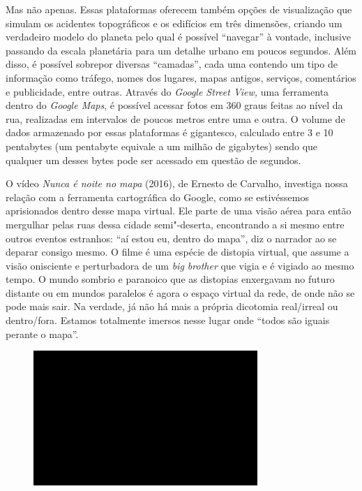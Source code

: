 Mas não apenas. Essas plataformas oferecem também opções de visualização
que simulam os acidentes topográficos e os edifícios em três dimensões,
criando um verdadeiro modelo do planeta pelo qual é possível ``navegar''
à vontade, inclusive passando da escala planetária para um detalhe
urbano em poucos segundos. Além disso, é possível sobrepor diversas
``camadas'', cada uma contendo um tipo de informação como tráfego, nomes
dos lugares, mapas antigos, serviços, comentários e publicidade, entre
outras. Através do \emph{Google Street View,} uma ferramenta dentro do
\emph{Google Maps}, é possível acessar fotos em 360 graus feitas ao
nível da rua, realizadas em intervalos de poucos metros entre uma e
outra. O volume de dados armazenado por essas plataformas é gigantesco,
calculado entre 3 e 10 pentabytes (um pentabyte equivale a um milhão de
gigabytes) sendo que qualquer um desses bytes pode ser acessado em
questão de segundos.

O vídeo \emph{Nunca é noite no mapa} (2016), de Ernesto de Carvalho,
investiga nossa relação com a ferramenta cartográfica do Google, como se
estivéssemos aprisionados dentro desse mapa virtual. Ele parte de uma
visão aérea para então mergulhar pelas ruas dessa cidade semi"-deserta,
encontrando a si mesmo entre outros eventos estranhos: ``aí estou eu,
dentro do mapa'', diz o narrador ao se deparar consigo mesmo. O filme é
uma espécie de distopia virtual, que assume a visão onisciente e
perturbadora de um \emph{big brother} que vigia e é vigiado ao mesmo
tempo. O mundo sombrio e paranoico que as distopias enxergavam no futuro
distante ou em mundos paralelos é agora o espaço virtual da rede, de
onde não se pode mais sair. Na verdade, já não há mais a própria
dicotomia real/irreal ou dentro/fora. Estamos totalmente imersos nesse
lugar onde ``todos são iguais perante o mapa''.

\begin{figure}[!ht]

\centering
 \includegraphics[width=85mm]{./imgs/im1.jpg}
\caption{\tiny{}}

\end{figure}

